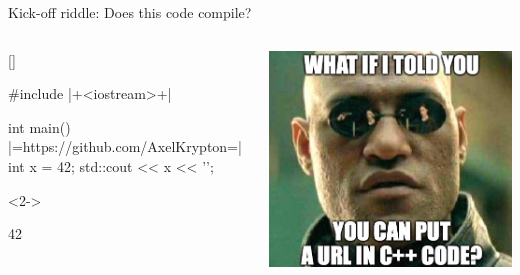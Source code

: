 \documentclass[usenames,dvipsnames,svgnames,14pt]{beamer}
\begin{document}
    \begin{frame}[fragile]{Kick-off riddle: Does this code compile?}{}
        \begin{columns}
            \begin{column}{0.58\textwidth}
                \begin{varblock}{}[\textwidth]{}
                    \begin{Cpp}
                        #include |+<iostream>+|

                        int main() {
                            |=https://github.com/AxelKrypton=|
                            int x = 42;
                            std::cout << x << '\n';
                        }
                    \end{Cpp}
                    \begin{uncoverenv}<2->
                        \begin{Bash}[numbers=none]
                            42
                        \end{Bash}
                    \end{uncoverenv}
                \end{varblock}
            \end{column}
            \begin{column}{0.42\textwidth}
                \centering
                \includegraphics[width=\columnwidth]{WIITY}
            \end{column}

\end{columns}
\end{frame}
\end{document}
